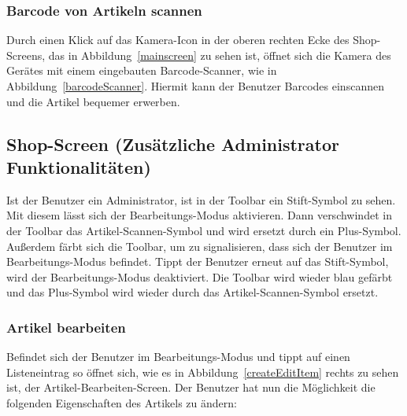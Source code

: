 
\subsubsection{Barcode von Artikeln scannen} \label{subsubsec:shop-scan-item}

Durch einen Klick auf das Kamera-Icon in der oberen rechten Ecke des Shop-Screens, das in Abbildung~\ref{mainscreen} zu sehen ist, öffnet sich die Kamera des Gerätes mit einem eingebauten Barcode-Scanner, wie in Abbildung~\ref{barcodeScanner}.
Hiermit kann der Benutzer Barcodes einscannen und die Artikel bequemer erwerben.


\subsection{Shop-Screen (Zusätzliche Administrator Funktionalitäten)} \label{subsec:shop-screen-admin}

Ist der Benutzer ein Administrator, ist in der Toolbar ein Stift-Symbol zu sehen.
Mit diesem lässt sich der Bearbeitungs-Modus aktivieren.
Dann verschwindet in der Toolbar das Artikel-Scannen-Symbol und wird ersetzt durch ein Plus-Symbol.
Außerdem färbt sich die Toolbar, um zu signalisieren, dass sich der Benutzer im Bearbeitungs-Modus befindet.
Tippt der Benutzer erneut auf das Stift-Symbol, wird der Bearbeitungs-Modus deaktiviert.
Die Toolbar wird wieder blau gefärbt und das Plus-Symbol wird wieder durch das Artikel-Scannen-Symbol ersetzt.

\subsubsection{Artikel bearbeiten} \label{subsubsec:shop-edit-items}

Befindet sich der Benutzer im Bearbeitungs-Modus und tippt auf einen Listeneintrag so öffnet sich, wie es in Abbildung~\ref{createEditItem} rechts zu sehen ist, der Artikel-Bearbeiten-Screen.
Der Benutzer hat nun die Möglichkeit die folgenden Eigenschaften des Artikels zu ändern:

